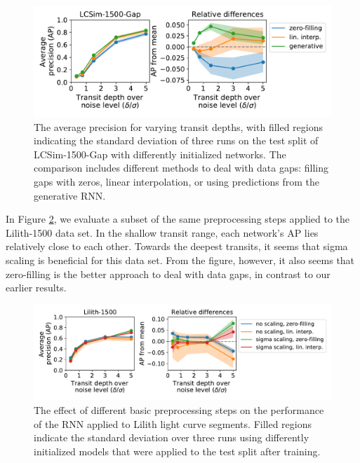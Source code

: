 \begin{figure}
    \centering
    \includegraphics[width=0.7\linewidth]{Experiments/Figures/Preprocessing/lcsim1500_AP_pp-gaps.pdf}
    \caption{The average precision for varying transit depths, with filled regions indicating the standard deviation of three runs on the test split of LCSim-1500-Gap with differently initialized networks. The comparison includes different methods to deal with data gaps: filling gaps with zeros, linear interpolation, or using predictions from the generative RNN.}
    \label{fig:lcsim_gaps}
\end{figure}

In Figure \ref{fig:lilith_pp_basic}, we evaluate a subset of the same preprocessing steps applied to the Lilith-1500 data set. In the shallow transit range, each network's AP lies relatively close to each other. Towards the deepest transits, it seems that sigma scaling is beneficial for this data set. From the figure, however, it also seems that zero-filling is the better approach to deal with data gaps, in contrast to our earlier results.

\begin{figure}
    \centering
    \includegraphics[width=0.8\linewidth]{Experiments/Figures/Preprocessing/lilith1500_AP_pp-basic-gaps.pdf}
    \caption{The effect of different basic preprocessing steps on the performance of the RNN applied to Lilith light curve segments. Filled regions indicate the standard deviation over three runs using differently initialized models that were applied to the test split after training.}
    \label{fig:lilith_pp_basic}
\end{figure}

